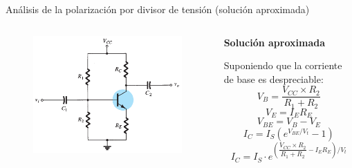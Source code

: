 \documentclass[t,aspectratio=169]{beamer}
\begin{document}
\begin{frame}{Análisis de la polarización por divisor de tensión (solución aproximada)}

\begin{columns}
\begin{column}{0.5\textwidth}

\begin{figure}
    \centering
    \includegraphics[width=\textwidth]{figures/polarizacion_divisor_tension.png}
\end{figure}

\end{column}
\begin{column}{0.5\textwidth}

\textbf{Solución aproximada}

Suponiendo que la corriente de base es despreciable:
%
\[ V_B = \dfrac{V_{CC} \times R_2}{R_1  + R_2 }  \]
%
\[ V_E = I_E R_E \]
%
\[ V_{BE} = V_B - V_E \]
%
\[ I_C = I_S \left( e^{V_{BE}/V_t} - 1 \right) \]
%
\[ I_C = I_S \cdot e^{\left(\dfrac{V_{CC} \times R_2}{R_1  + R_2 }-I_E R_E\right)/V_t} \]

\end{column}
\end{columns}

\end{frame}
\end{document}
